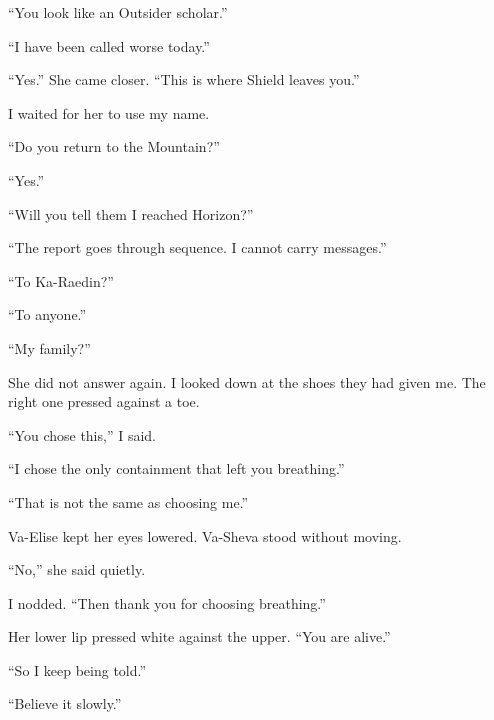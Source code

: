 ``You look like an Outsider scholar.''\par

``I have been called worse today.''\par

``Yes.'' She came closer. ``This is where Shield leaves you.''\par

I waited for her to use my name.\par

``Do you return to the Mountain?''\par

``Yes.''\par

``Will you tell them I reached Horizon?''\par

``The report goes through sequence. I cannot carry messages.''\par

``To Ka-Raedin?''\par

``To anyone.''\par

``My family?''\par

She did not answer again. I looked down at the shoes they had given me. The right one pressed against a toe.\par

``You chose this,'' I said.\par

``I chose the only containment that left you breathing.''\par

``That is not the same as choosing me.''\par

Va-Elise kept her eyes lowered. Va-Sheva stood without moving.\par

``No,'' she said quietly.\par

I nodded. ``Then thank you for choosing breathing.''\par

Her lower lip pressed white against the upper. ``You are alive.''\par

``So I keep being told.''\par

``Believe it slowly.''\par


